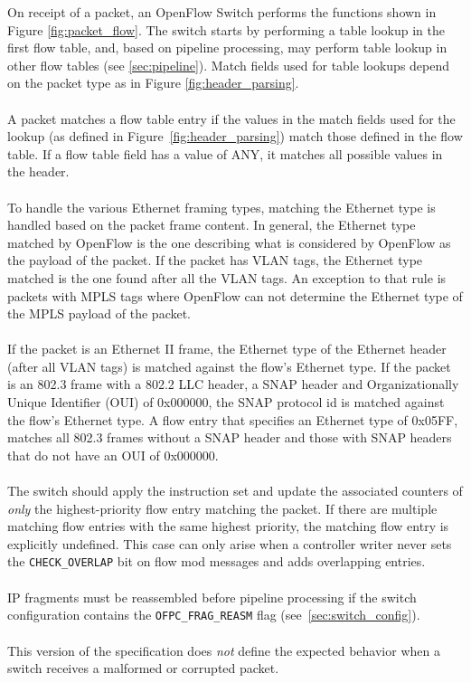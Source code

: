 \documentclass[10pt]{article}
\begin{document}
On receipt of a packet, an OpenFlow Switch performs the functions shown in Figure \ref{fig:packet_flow}. The switch starts by performing a table lookup in the first flow table, and, based on pipeline processing, may perform table lookup in other flow tables (see \ref{sec:pipeline}). Match fields used for table lookups depend on the packet type as in Figure \ref{fig:header_parsing}.
\\\\
A packet matches a flow table entry if the values in the match fields used for the lookup (as defined in Figure~\ref{fig:header_parsing}) match those defined in the flow table.  If a flow table field has a value of ANY, it matches all possible values in the header.  
\\\\
To handle the various Ethernet framing types, matching the Ethernet type is handled based on the packet frame content. In general, the Ethernet type matched by OpenFlow is the one describing what is considered by OpenFlow as the payload of the packet. If the packet has VLAN tags, the Ethernet type matched is the one found after all the VLAN tags. An exception to that rule is packets with MPLS tags where OpenFlow can not determine the Ethernet type of the MPLS payload of the packet.
\\\\
If the packet is an Ethernet II frame, the Ethernet type of the Ethernet header (after all VLAN tags) is matched against the flow's Ethernet type. If the packet is an 802.3 frame with a 802.2 LLC header, a SNAP header and Organizationally Unique Identifier (OUI) of 0x000000, the SNAP protocol id is matched against the flow's Ethernet type.  A flow entry that specifies an Ethernet type of 0x05FF, matches all 802.3 frames without a SNAP header and those with SNAP headers that do not have an OUI of 0x000000.  
\\\\
The switch should apply the instruction set and update the associated counters of \emph{only} the highest-priority flow entry matching the packet.  If there are multiple matching flow entries with the same highest priority, the matching flow entry is explicitly undefined.  This case can only arise when a controller writer never sets the \verb|CHECK_OVERLAP| bit on flow mod messages and adds overlapping entries.
\\\\
IP fragments must be reassembled before pipeline processing if the switch configuration contains the \verb|OFPC_FRAG_REASM| flag (see~\ref{sec:switch_config}).
\\\\
This version of the specification does \emph{not} define the expected behavior when a switch receives a malformed or corrupted packet. 
\end{document}
